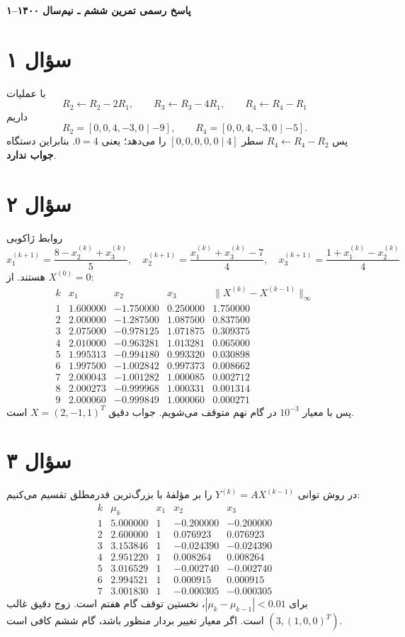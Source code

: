 \documentclass[12pt]{article}
\begin{document}
\begin{center}{\Large\textbf{پاسخ رسمی تمرین ششم ـ نیم‌سال ۱۴۰۰--۱}}\end{center}

\section*{سؤال ۱}
با عملیات
\[
 R_2\leftarrow R_2-2R_1,\qquad
 R_3\leftarrow R_3-4R_1,\qquad
 R_4\leftarrow R_4-R_1
\]
داریم
\[
 R_2=[0,0,4,-3,0\mid-9],\qquad
 R_4=[0,0,4,-3,0\mid-5].
\]
پس \(R_4\leftarrow R_4-R_2\) سطر \([0,0,0,0,0\mid4]\) را می‌دهد؛ یعنی \(0=4\). بنابراین دستگاه \textbf{جواب ندارد}.

\section*{سؤال ۲}
روابط ژاکوبی
\[
 x_1^{(k+1)}=\frac{8-x_2^{(k)}+x_3^{(k)}}5,
 \quad x_2^{(k+1)}=\frac{x_1^{(k)}+x_3^{(k)}-7}{4},
 \quad x_3^{(k+1)}=\frac{1+x_1^{(k)}-x_2^{(k)}}4
\]
هستند. از \(X^{(0)}=0\):
\[
\begin{array}{c|rrr|c}
k&x_1&x_2&x_3&\|X^{(k)}-X^{(k-1)}\|_\infty\\ \hline
1&1.600000&-1.750000&0.250000&1.750000\\
2&2.000000&-1.287500&1.087500&0.837500\\
3&2.075000&-0.978125&1.071875&0.309375\\
4&2.010000&-0.963281&1.013281&0.065000\\
5&1.995313&-0.994180&0.993320&0.030898\\
6&1.997500&-1.002842&0.997373&0.008662\\
7&2.000043&-1.001282&1.000085&0.002712\\
8&2.000273&-0.999968&1.000331&0.001314\\
9&2.000060&-0.999849&1.000060&0.000271
\end{array}
\]
پس با معیار \(10^{-3}\) در گام نهم متوقف می‌شویم. جواب دقیق \(X=(2,-1,1)^T\) است.

\clearpage
\section*{سؤال ۳}
در روش توانی \(Y^{(k)}=AX^{(k-1)}\) را بر مؤلفهٔ با بزرگ‌ترین قدرمطلق تقسیم می‌کنیم:
\[
\begin{array}{c|r|rrr}
k&\mu_k&x_1&x_2&x_3\\ \hline
1&5.000000&1&-0.200000&-0.200000\\
2&2.600000&1&0.076923&0.076923\\
3&3.153846&1&-0.024390&-0.024390\\
4&2.951220&1&0.008264&0.008264\\
5&3.016529&1&-0.002740&-0.002740\\
6&2.994521&1&0.000915&0.000915\\
7&3.001830&1&-0.000305&-0.000305
\end{array}
\]
برای \(|\mu_k-\mu_{k-1}|<0.01\)، نخستین توقف گام هفتم است. زوج دقیق غالب \((3,(1,0,0)^T)\) است. اگر معیار تغییر بردار منظور باشد، گام ششم کافی است.
\end{document}
